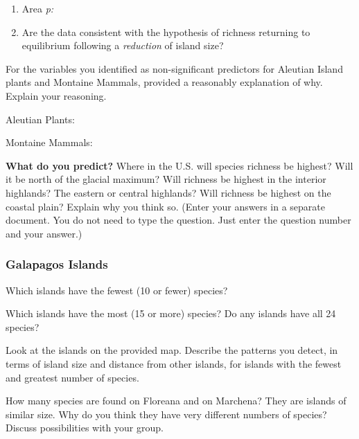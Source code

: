 \documentclass[11pt, addpoints]{exam}
\begin{document}
\begin{questions}
\begin{enumerate}
\begin{enumerate}
	\item Area \textit{p:}
	
	\item Are the data consistent with the hypothesis of richness returning to equilibrium following a \textit{reduction} of island size?
	
\end{enumerate}

\end{enumerate}

\question[10]
For the variables you identified as non-significant predictors for Aleutian Island plants and Montaine Mammals, provided a reasonably explanation of why. Explain your reasoning.

Aleutian Plants: \bigskip

Montaine Mammals:\bigskip


\question
\textbf{What do you predict?} Where in the U.S. will species richness be highest? Will it be north of the glacial maximum? Will richness be highest in the interior highlands? The eastern or central highlands? Will richness be highest on the coastal plain? Explain why you think so. (Enter your answers in a separate document. You do not need to type the question. Just enter the question number and your answer.)


\subsubsection*{Galapagos Islands}


\question[2] 
Which islands have the fewest (10 or fewer) species?

\question[2]
Which islands have the most (15 or more) species? Do any islands have all 24 species?

\question[2]
Look at the islands on the provided map. Describe the patterns you detect, in terms of island size and distance from other islands, for islands with the fewest and greatest number of species.

\question[2]
How many species are found on Floreana and on Marchena? They are islands of similar size. Why do you think they have very different numbers of species? Discuss possibilities with your group.


\end{questions}
\end{document}
